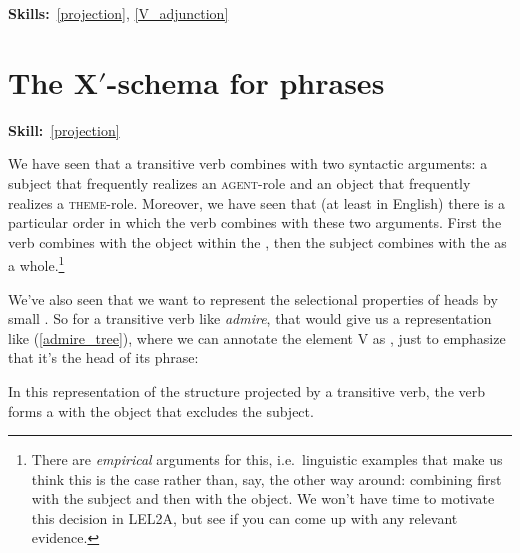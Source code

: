 \documentclass{article}
\begin{document}
\maketitle
\subtitle{Topic 5 Course Notes: X-bar and the Clause Part 1\\
X-Bar Schema}
\hfill{}\textbf{Skills:}~\ref{projection},
\ref{V_adjunction}

\section[The X-bar schema for phrases]{The X$'$-schema for phrases}
\hfill{}\textbf{Skill:}~\ref{projection}

We have seen that a transitive verb combines with two syntactic arguments: a subject that frequently realizes an \textsc{agent}-role and an object that frequently realizes a \textsc{theme}-role.
Moreover, we have seen that (at least in English) there is a particular order in which the verb combines with these two arguments.
First the verb combines with the object within the , then the subject combines with the  as a whole.\footnote{There are \emph{empirical} arguments for this, i.e.~linguistic examples that make us think this is the case rather than, say, the other way around: combining first with the subject and then with the object. We won't have time to motivate this decision in LEL2A, but see if you can come up with any relevant evidence.}

We've also seen that we want to represent the selectional properties of heads by small .
So for a transitive verb like \emph{admire}, that would give us a representation like (\ref{admire_tree}), where we can annotate the element V as , just to emphasize that it's the head of its phrase:
\begin{exe}
    \label{admire_tree}
\end{exe}
In this representation of the structure projected by a transitive verb, the verb forms a  with the object that excludes the subject.
\end{document}
